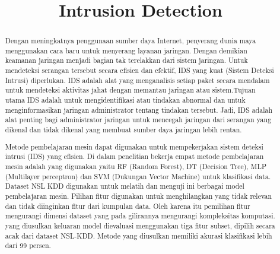 \documentclass[conference]{IEEEtran}
\begin{document}
\title{Intrusion Detection\\
}

\author{
}

\maketitle

\begin{abstract}
Dengan meningkatnya penggunaan sumber daya Internet, penyerang dunia maya menggunakan cara baru untuk menyerang layanan jaringan. Dengan demikian keamanan jaringan menjadi bagian tak terelakkan dari sistem jaringan. Untuk mendeteksi serangan tersebut secara efisien dan efektif, IDS yang kuat (Sistem Deteksi Intrusi) diperlukan. IDS adalah alat yang menganalisis setiap paket secara mendalam untuk mendeteksi aktivitas jahat dengan memantau jaringan atau sistem.Tujuan utama IDS adalah untuk mengidentifikasi atau tindakan abnormal dan untuk menginformasikan jaringan administrator tentang tindakan tersebut. Jadi, IDS adalah alat penting bagi administrator jaringan untuk mencegah jaringan dari serangan yang dikenal dan tidak dikenal yang membuat sumber daya jaringan lebih rentan. 

Metode pembelajaran mesin dapat digunakan untuk mempekerjakan sistem deteksi intrusi (IDS) yang efisien. Di dalam penelitian bekerja empat metode pembelajaran mesin adalah yang digunakan yaitu RF (Random Forest), DT (Decision Tree), MLP (Multilayer perceptron) dan SVM (Dukungan Vector Machine) untuk klasifikasi data. Dataset NSL KDD digunakan untuk melatih dan menguji ini berbagai model pembelajaran mesin. Pilihan fitur digunakan untuk menghilangkan yang tidak relevan dan tidak diinginkan fitur dari kumpulan data. Oleh karena itu pemilihan fitur mengurangi dimensi dataset yang pada gilirannya mengurangi kompleksitas komputasi. yang diusulkan keluaran model dievaluasi menggunakan tiga fitur subset, dipilih secara acak dari dataset NSL-KDD. Metode yang diusulkan memiliki akurasi klasifikasi lebih dari 99 persen.
\end{abstract}
\end{document}

